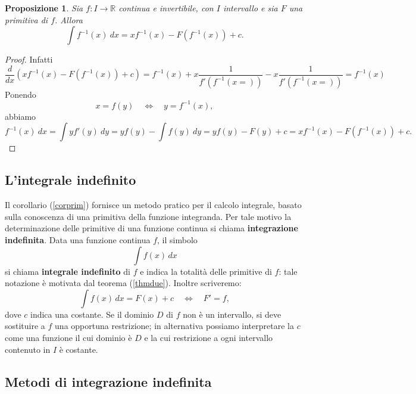 \documentclass{article}
\theoremstyle{plain}
\newtheorem{prop}[thm]{Proposizione}
\theoremstyle{definition}
\theoremstyle{remark}
\begin{document}
\vspace{10pt}

\begin{bxthm}
\begin{prop}
    Sia $f:I\to\mathbb{R}$ continua e invertibile, con $I$ intervallo e sia $F$ una primitiva di $f$.
    Allora \[\int f^{-1}(x)\ dx = xf^{-1}(x)-F(f^{-1}(x))+c.\]
\end{prop}
\end{bxthm}
\begin{proof}
    Infatti \[\dfrac{d}{dx}(xf^{-1}(x)-F(f^{-1}(x))+c)=f^{-1}(x)+x\dfrac{1}{f'(f^{-1}(x=))}-x\dfrac{1}{f'(f^{-1}(x=))}=f^{-1}(x)\]
    Ponendo \[x=f(y)\quad\iff\quad y=f^{-1}(x),\] abbiamo 
    \[ f^{-1}(x)\ dx=\int y f'(y)\ dy=yf(y)-\int f(y)\ dy=yf(y)-F(y)+c=xf^{-1}(x)-F(f^{-1}(x))+c. \]
\end{proof}

\vspace{10pt}

\subsection{L'integrale indefinito}

\vspace{10pt}

Il corollario (\ref{corprim}) fornisce un metodo pratico per il calcolo integrale, basato sulla conoscenza di una primitiva della funzione integranda. 
Per tale motivo la determinazione delle primitive di una funzione continua si chiama \textbf{integrazione indefinita}.
Data una funzione continua $f$, il simbolo \[\int f(x)\,dx\] si chiama \textbf{integrale indefinito} di $f$ e indica la totalità delle primitive di $f$: tale notazione è motivata dal teorema (\ref{thmdue}).
Inoltre scriveremo: 
\[\int f(x)\,dx=F(x)+c\quad\iff\quad F'=f,\]
dove $c$ indica una costante. Se il dominio $D$ di $f$ non è un intervallo, si deve sostituire a $f$ una opportuna restrizione; in alternativa possiamo interpretare la $c$ come una funzione il cui dominio è $D$ e la cui restrizione a ogni intervallo contenuto in $I$ è costante. 

\vspace{10pt}

\subsection{Metodi di integrazione indefinita}

\vspace{10pt}
\end{document}
